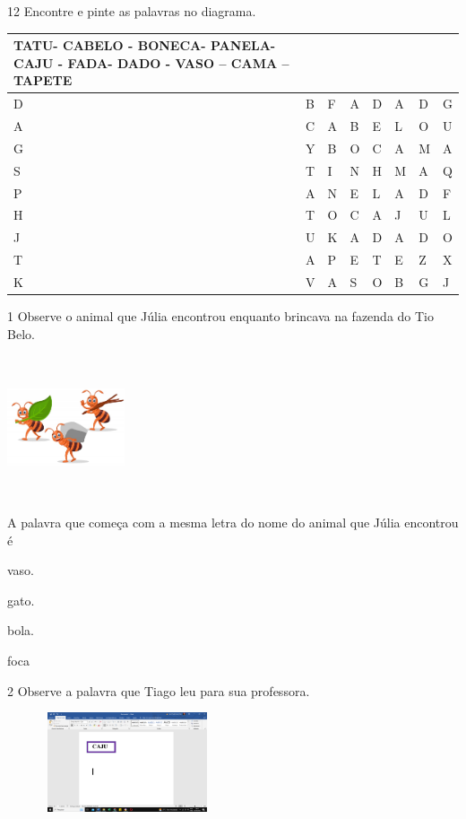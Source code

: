 \num{12} Encontre e pinte as palavras no diagrama.


\begin{longtable}[]{@{}llllllll@{}}
\toprule
TATU- CABELO - BONECA- PANELA- CAJU - FADA- DADO - VASO -- CAMA --
TAPETE\tabularnewline
\midrule
\endhead
D & B & F & A & D & A & D & G\tabularnewline
A & C & A & B & E & L & O & U\tabularnewline
G & Y & B & O & C & A & M & A\tabularnewline
S & T & I & N & H & M & A & Q\tabularnewline
P & A & N & E & L & A & D & F\tabularnewline
H & T & O & C & A & J & U & L\tabularnewline
J & U & K & A & D & A & D & O\tabularnewline
T & A & P & E & T & E & Z & X\tabularnewline
K & V & A & S & O & B & G & J\tabularnewline
\bottomrule
\end{longtable}


\num{1} Observe o animal que Júlia encontrou enquanto brincava na 
fazenda do Tio Belo.

\includegraphics[width=1.36528in,height=1.64861in]{media/image42.jpeg}


A palavra que começa com a mesma letra do nome do animal que Júlia
encontrou é

\begin{escolha}
\item vaso.

\item gato.

\item bola.

\item foca
\end{escolha}


\num{2} Observe a palavra que Tiago leu para sua professora.

\includegraphics[width=2.79792in,height=1.15833in]{media/image43.png}

